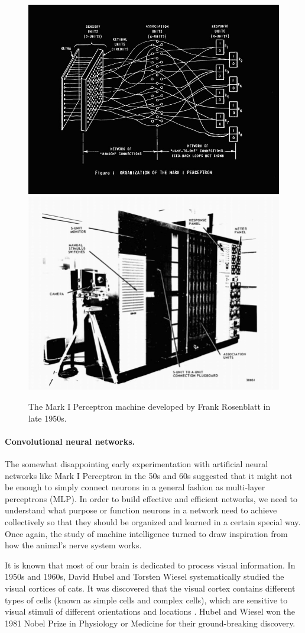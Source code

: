 \documentclass[../../book-main.tex]{subfiles}
\begin{document}
\begin{figure}
    \centering
    \includegraphics[width=0.45\linewidth]{figures/visu-large.jpg}
    \hspace{2mm} \includegraphics[width=0.45\linewidth]{figures/Original-Mark-I-perceptron-as-seen-in-its-operators-manual-20.ppm.png}
    \caption{The Mark I Perceptron machine developed by Frank Rosenblatt in late 1950s.}
    \label{fig:perceptron}
\end{figure}


\paragraph{Convolutional neural networks.}
The somewhat disappointing early experimentation with artificial neural networks like Mark I Perceptron in the 50s and 60s suggested that it might not be enough to simply connect neurons in a general fashion as multi-layer perceptrons (MLP). In order to build effective and efficient networks, we need to understand what purpose or function neurons in a network need to achieve collectively so that they should be organized and learned in a certain special way. Once again, the study of machine intelligence turned to draw inspiration from how the animal's nerve system works. 

It is known that most of our brain is dedicated to process visual information. In 1950s and 1960s, David Hubel and Torsten Wiesel systematically studied the visual cortices of cats. It was discovered that the visual cortex contains different types of cells (known as simple cells and complex cells), which are sensitive to visual stimuli of different orientations and locations \cite{Hubel-Wiesel-1959}. Hubel and Wiesel won the 1981 Nobel Prize in Physiology or Medicine for their ground-breaking discovery. 
\end{document}
